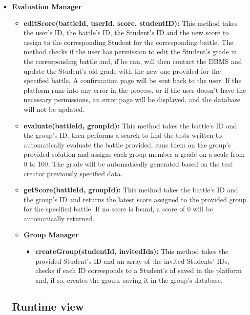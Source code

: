 \documentclass{article}
\begin{document}
{\begin{itemize}
\begin{itemize}
    \end{itemize}
    \item \textbf{Evaluation Manager}
    \begin{itemize}
        \item \textbf{editScore(battleId, userId, score, studentID):} This method takes the user's ID, the battle's ID, the Student's ID and the new score to assign to the 
        corresponding Student for the corresponding battle. The method checks if the user has permission to edit the Student's grade in the corresponding battle and, 
        if he can, will then contact the DBMS and update the Student's old grade with the new one provided for the specified battle. 
        A confirmation page will be sent back to the user.
        If the platform runs into any error in the process, or if the user doesn't have the necessary permissions, an error page will be displayed, and the database will not be
        updated.
        \item \textbf{evaluate(battleId, groupId):} This method takes the battle's ID and the group's ID, then performs a search to find the tests written to automatically
        evaluate the battle provided, runs them on the group's provided solution and assigns each group member a grade on a scale from 0 to 100.
        The grade will be automatically generated based on the test creator previously specified data.
        \item \textbf{getScore(battleId, groupId):}  This method takes the battle's ID and the group's ID and returns the latest score assigned to the provided group for the 
        specified battle. If no score is found, a score of 0 will be automatically returned.
    \item \textbf{Group Manager}
    \begin{itemize}
        \item \textbf{createGroup(studentId, invitedIds):} This method takes the provided Student's ID and an array of the invited Students' IDs, checks if each ID corresponds
        to a Student's id saved in the platform and, if so, creates the group, saving it in the group's database.  
    \end{itemize}
\end{itemize}
\subsection{Runtime view}

\end{itemize}}
\end{document}
